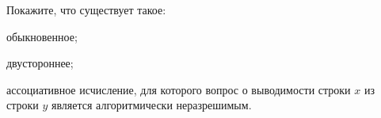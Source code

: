 Покажите, что существует такое:
\begin{enumcyr}
    \item обыкновенное;
    \item двустороннее;
\end{enumcyr}
ассоциативное исчисление, для которого вопрос о выводимости строки $x$ из строки $y$ является
алгоритмически неразрешимым.